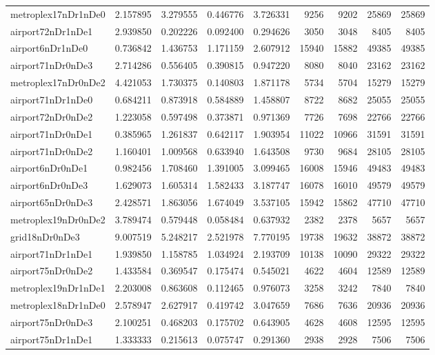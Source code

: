 \begin{longtable}{|l|r|r|r|r|r|r|r|r|}
metroplex17nDr1nDe0 & 2.157895 & 3.279555 & 0.446776 & 3.726331 & 9256 & 9202 & 25869 & 25869 \\
airport72nDr1nDe1 & 2.939850 & 0.202226 & 0.092400 & 0.294626 & 3050 & 3048 & 8405 & 8405 \\
airport6nDr1nDe0 & 0.736842 & 1.436753 & 1.171159 & 2.607912 & 15940 & 15882 & 49385 & 49385 \\
airport71nDr0nDe3 & 2.714286 & 0.556405 & 0.390815 & 0.947220 & 8080 & 8040 & 23162 & 23162 \\
metroplex17nDr0nDe2 & 4.421053 & 1.730375 & 0.140803 & 1.871178 & 5734 & 5704 & 15279 & 15279 \\
airport71nDr1nDe0 & 0.684211 & 0.873918 & 0.584889 & 1.458807 & 8722 & 8682 & 25055 & 25055 \\
airport72nDr0nDe2 & 1.223058 & 0.597498 & 0.373871 & 0.971369 & 7726 & 7698 & 22766 & 22766 \\
airport71nDr0nDe1 & 0.385965 & 1.261837 & 0.642117 & 1.903954 & 11022 & 10966 & 31591 & 31591 \\
airport71nDr0nDe2 & 1.160401 & 1.009568 & 0.633940 & 1.643508 & 9730 & 9684 & 28105 & 28105 \\
airport6nDr0nDe1 & 0.982456 & 1.708460 & 1.391005 & 3.099465 & 16008 & 15946 & 49483 & 49483 \\
airport6nDr0nDe3 & 1.629073 & 1.605314 & 1.582433 & 3.187747 & 16078 & 16010 & 49579 & 49579 \\
airport65nDr0nDe3 & 2.428571 & 1.863056 & 1.674049 & 3.537105 & 15942 & 15862 & 47710 & 47710 \\
metroplex19nDr0nDe2 & 3.789474 & 0.579448 & 0.058484 & 0.637932 & 2382 & 2378 & 5657 & 5657 \\
grid18nDr0nDe3 & 9.007519 & 5.248217 & 2.521978 & 7.770195 & 19738 & 19632 & 38872 & 38872 \\
airport71nDr1nDe1 & 1.939850 & 1.158785 & 1.034924 & 2.193709 & 10138 & 10090 & 29322 & 29322 \\
airport75nDr0nDe2 & 1.433584 & 0.369547 & 0.175474 & 0.545021 & 4622 & 4604 & 12589 & 12589 \\
metroplex19nDr1nDe1 & 2.203008 & 0.863608 & 0.112465 & 0.976073 & 3258 & 3242 & 7840 & 7840 \\
metroplex18nDr1nDe0 & 2.578947 & 2.627917 & 0.419742 & 3.047659 & 7686 & 7636 & 20936 & 20936 \\
airport75nDr0nDe3 & 2.100251 & 0.468203 & 0.175702 & 0.643905 & 4628 & 4608 & 12595 & 12595 \\
airport75nDr1nDe1 & 1.333333 & 0.215613 & 0.075747 & 0.291360 & 2938 & 2928 & 7506 & 7506 \\

\end{longtable}
